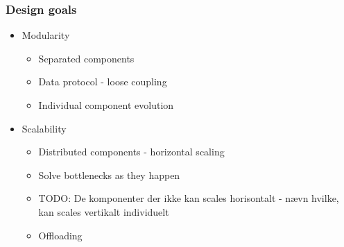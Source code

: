\begin{frame}
    \frametitle{Design goals}
    \centering
    \begin{itemize}
      \item Modularity
      \begin{itemize}
        \item Separated components
        \item Data protocol - loose coupling
        \item Individual component evolution
      \end{itemize}
      \item Scalability
      \begin{itemize}
        \item Distributed components - horizontal scaling
        \item Solve bottlenecks as they happen
        \item TODO: De komponenter der ikke kan scales horisontalt - nævn hvilke, kan scales vertikalt individuelt
        \item Offloading
      \end{itemize}
    \end{itemize}
\end{frame}

\begin{frame}
    \centering
    \resizebox{\textwidth}{!}{%
      
    }
\end{frame}